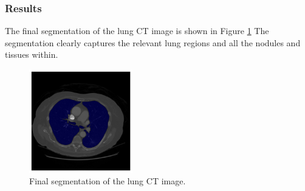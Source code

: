\documentclass[11pt]{article}
\begin{document}
\subsubsection{Results}
The final segmentation of the lung CT image is shown in Figure \ref{fig:lung_ct_segmentation} The segmentation clearly captures the relevant lung regions and all the nodules and tissues within.
\begin{figure}[H]
    \centering
    \includegraphics[width=0.4\textwidth]{figs/q1a.png}
    \caption{Final segmentation of the lung CT image.}
    \label{fig:lung_ct_segmentation}
\end{figure}
\end{document}
